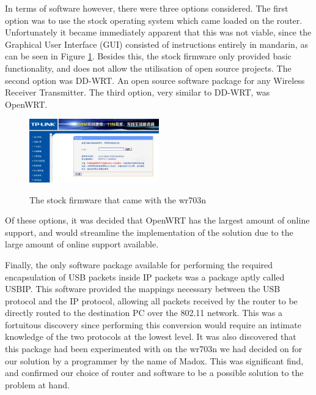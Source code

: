 In terms of software however, there were three options considered. The first option was to use the stock operating system which came loaded on the router. Unfortunately it became immediately apparent that this was not viable, since the Graphical User Interface (GUI) consisted of instructions entirely in mandarin, as can be seen in Figure \ref{TEL_wr703nfirmware}. Besides this, the stock firmware only provided basic functionality, and does not allow the utilisation of open source projects. The second option was DD-WRT. An open source software package for any Wireless Receiver Transmitter. The third option, very similar to DD-WRT, was OpenWRT.

\begin{figure}[h!]
  \caption{The stock firmware that came with the wr703n}
  \centering
    \includegraphics[width=0.5\textwidth]{Images/Telemetry/TEL_wr703nfirmware.jpg}
    \label{TEL_wr703nfirmware}
\end{figure}


Of these options, it was decided that OpenWRT has the largest amount of online support\cite{wr703n_instructables}\cite{wr703n_hackaday}\cite{MAN_OPENWRT}\cite{openwrt_buyersguide}, and would streamline the implementation of the solution due to the large amount of online support available.

Finally, the only software package available for performing the required encapsulation of USB packets inside IP packets was a package aptly called USBIP\cite{USBIP_homepage}. This software provided the mappings necessary between the USB protocol and the IP protocol\cite{MAN_USBIP}, allowing all packets received by the router to be directly routed to the destination PC over the 802.11 network. This was a fortuitous discovery since performing this conversion would require an intimate knowledge of the two protocols at the lowest level. It was also discovered that this package had been experimented with on the wr703n we had decided on for our solution by a programmer by the name of Madox\cite{madox_wr703n}\cite{madox_exampleusbip}. This was significant find, and confirmed our choice of router and software to be a possible solution to the problem at hand.

